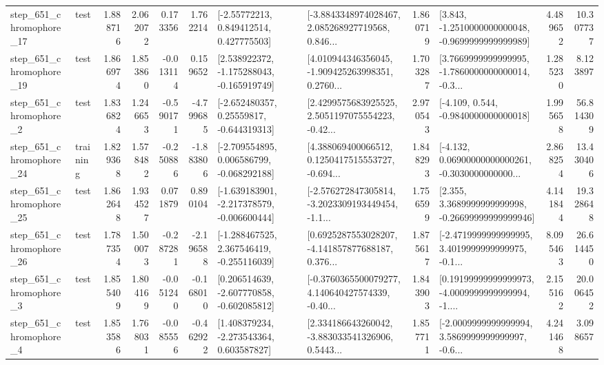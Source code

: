 \begin{tabular}{llrrrrllrlrr}
  step\_651\_chromophore\_17 &      test &      1.888716 &    2.062072 &      0.173356 &  1.762214 &     [-2.55772213, 0.849412514, 0.427775503] &  [-3.8843348974028467, 2.085268927719568, 0.846... &       1.860719 &  [3.843, -1.2510000000000048, -0.9699999999999989] &            4.489652 &         10.307737 \\
  step\_651\_chromophore\_19 &      test &      1.866974 &    1.853860 &     -0.013114 &  0.159652 &   [2.538922372, -1.175288043, -0.165919749] &  [4.010944346356045, -1.909425263998351, 0.2760... &       1.703287 &  [3.7669999999999995, -1.7860000000000014, -0.3... &            1.285230 &          8.123897 \\
   step\_651\_chromophore\_2 &      test &      1.836824 &    1.246653 &     -0.590171 & -4.799685 &    [-2.652480357, 0.25559817, -0.644319313] &  [2.4299575683925525, 2.5051197075554223, -0.42... &       2.970543 &               [-4.109, 0.544, -0.9840000000000018] &            1.995658 &         56.814309 \\
  step\_651\_chromophore\_24 &  training &      1.829368 &    1.578482 &     -0.250886 & -1.883806 &   [-2.709554895, 0.006586799, -0.068292188] &  [4.388069400066512, 0.1250417515553727, -0.694... &       1.848293 &  [-4.132, 0.06900000000000261, -0.3030000000000... &            2.868254 &         13.430406 \\
  step\_651\_chromophore\_25 &      test &      1.862648 &    1.934527 &      0.071879 &  0.890104 &  [-1.639183901, -2.217378579, -0.006600444] &  [-2.576272847305814, -3.2023309193449454, -1.1... &       1.756599 &  [2.355, 3.3689999999999998, -0.26699999999999946] &            4.141844 &         19.328648 \\
  step\_651\_chromophore\_26 &      test &      1.787354 &    1.500073 &     -0.287281 & -2.196588 &   [-1.288467525, 2.367546419, -0.255116039] &  [0.6925287553028207, -4.141857877688187, 0.376... &       1.875617 &  [-2.4719999999999995, 3.4019999999999975, -0.1... &            8.095463 &         26.614450 \\
   step\_651\_chromophore\_3 &      test &      1.855409 &    1.804169 &     -0.051240 & -0.168010 &   [0.206514639, -2.607770858, -0.602085812] &  [-0.3760365500079277, 4.140640427574339, -0.40... &       1.843903 &  [0.19199999999999973, -4.0009999999999994, -1.... &            2.155162 &         20.006452 \\
   step\_651\_chromophore\_4 &      test &      1.853586 &    1.768031 &     -0.085556 & -0.462922 &    [1.408379234, -2.273543364, 0.603587827] &  [2.334186643260042, -3.883033541326906, 0.5443... &       1.857711 &  [-2.0009999999999994, 3.5869999999999997, -0.6... &            4.241468 &          3.098657 \\

\end{tabular}
